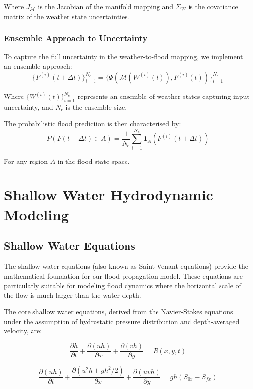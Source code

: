 \documentclass{article}
\begin{document}
Where $J_{\mathcal{M}}$ is the Jacobian of the manifold mapping and $\Sigma_W$ is the covariance matrix of the weather state uncertainties.

\subsubsection{Ensemble Approach to Uncertainty}
To capture the full uncertainty in the weather-to-flood mapping, we implement an ensemble approach:
\begin{equation}
\{F^{(i)}(t+\Delta t)\}_{i=1}^{N_e} = \{\Psi(\mathcal{M}(W^{(i)}(t)), F^{(i)}(t))\}_{i=1}^{N_e}
\end{equation}

Where $\{W^{(i)}(t)\}_{i=1}^{N_e}$ represents an ensemble of weather states capturing input uncertainty, and $N_e$ is the ensemble size.

The probabilistic flood prediction is then characterised by:
\begin{equation}
P(F(t+\Delta t) \in A) = \frac{1}{N_e}\sum_{i=1}^{N_e} \mathbf{1}_{A}(F^{(i)}(t+\Delta t))
\end{equation}

For any region $A$ in the flood state space.

\section{Shallow Water Hydrodynamic Modeling}
\subsection{Shallow Water Equations}
The shallow water equations (also known as Saint-Venant equations) provide the mathematical foundation for our flood propagation model. These equations are particularly suitable for modeling flood dynamics where the horizontal scale of the flow is much larger than the water depth.

The core shallow water equations, derived from the Navier-Stokes equations under the assumption of hydrostatic pressure distribution and depth-averaged velocity, are:

\begin{equation}
\frac{\partial h}{\partial t} + \frac{\partial(uh)}{\partial x} + \frac{\partial(vh)}{\partial y} = R(x,y,t)
\end{equation}

\begin{equation}
\frac{\partial(uh)}{\partial t} + \frac{\partial(u^2h + gh^2/2)}{\partial x} + \frac{\partial(uvh)}{\partial y} = gh(S_{0x} - S_{fx})
\end{equation}
\end{document}
